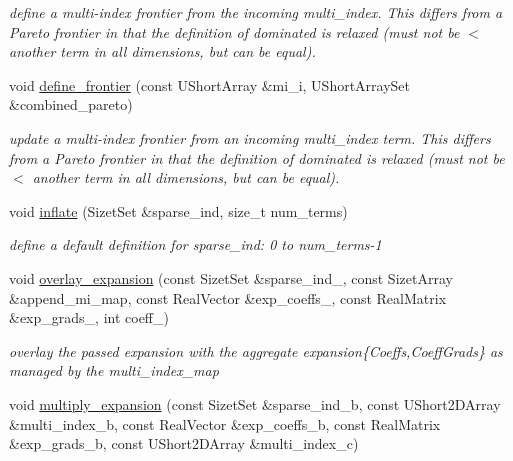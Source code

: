\begin{DoxyCompactItemize}
\begin{DoxyCompactList}\small\item\em define a multi-\/index frontier from the incoming multi\+\_\+index. This differs from a Pareto frontier in that the definition of dominated is relaxed (must not be $<$ another term in all dimensions, but can be equal). \end{DoxyCompactList}\item 
void \hyperlink{classPecos_1_1RegressOrthogPolyApproximation_afcbd478e4d15e4b4a409ceb96f816da1}{define\+\_\+frontier} (const U\+Short\+Array \&mi\+\_\+i, U\+Short\+Array\+Set \&combined\+\_\+pareto)\label{classPecos_1_1RegressOrthogPolyApproximation_afcbd478e4d15e4b4a409ceb96f816da1}

\begin{DoxyCompactList}\small\item\em update a multi-\/index frontier from an incoming multi\+\_\+index term. This differs from a Pareto frontier in that the definition of dominated is relaxed (must not be $<$ another term in all dimensions, but can be equal). \end{DoxyCompactList}\item 
void \hyperlink{classPecos_1_1RegressOrthogPolyApproximation_a22d8b8acb914d470168b4d2e54108bcc}{inflate} (Sizet\+Set \&sparse\+\_\+ind, size\+\_\+t num\+\_\+terms)\label{classPecos_1_1RegressOrthogPolyApproximation_a22d8b8acb914d470168b4d2e54108bcc}

\begin{DoxyCompactList}\small\item\em define a default definition for sparse\+\_\+ind\+: 0 to num\+\_\+terms-\/1 \end{DoxyCompactList}\item 
void \hyperlink{classPecos_1_1RegressOrthogPolyApproximation_ae7bff164ddf6a1808fcd160250394db3}{overlay\+\_\+expansion} (const Sizet\+Set \&sparse\+\_\+ind\+\_, const Sizet\+Array \&append\+\_\+mi\+\_\+map, const Real\+Vector \&exp\+\_\+coeffs\+\_, const Real\+Matrix \&exp\+\_\+grads\+\_, int coeff\+\_)\label{classPecos_1_1RegressOrthogPolyApproximation_ae7bff164ddf6a1808fcd160250394db3}

\begin{DoxyCompactList}\small\item\em overlay the passed expansion with the aggregate expansion\{Coeffs,Coeff\+Grads\} as managed by the multi\+\_\+index\+\_\+map \end{DoxyCompactList}\item 
void \hyperlink{classPecos_1_1RegressOrthogPolyApproximation_a6f7fd05fcf79dadea0f443e654524ef0}{multiply\+\_\+expansion} (const Sizet\+Set \&sparse\+\_\+ind\+\_\+b, const U\+Short2\+D\+Array \&multi\+\_\+index\+\_\+b, const Real\+Vector \&exp\+\_\+coeffs\+\_\+b, const Real\+Matrix \&exp\+\_\+grads\+\_\+b, const U\+Short2\+D\+Array \&multi\+\_\+index\+\_\+c)\label{classPecos_1_1RegressOrthogPolyApproximation_a6f7fd05fcf79dadea0f443e654524ef0}


\end{DoxyCompactItemize}
